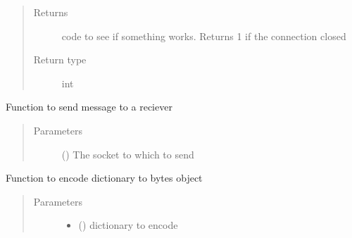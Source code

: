 \documentclass[letterpaper,10pt,english]{sphinxmanual}
\begin{document}
\begin{fulllineitems}
\begin{fulllineitems}
\begin{quote}
\begin{description}
\begin{itemize}
\end{itemize}

\item[{Returns}] \leavevmode
code to see if something works. Returns \sphinxhyphen{}1 if the connection closed

\item[{Return type}] \leavevmode
int

\end{description}\end{quote}

\end{fulllineitems}


\begin{fulllineitems}
\label{\detokenize{Message:Message.Message._send_msg_to_reciever}}
Function to send message to a reciever
\begin{quote}\begin{description}
\item[{Parameters}] \leavevmode
{} () \textendash{} The socket to which to send

\end{description}\end{quote}

\end{fulllineitems}


\begin{fulllineitems}
\label{\detokenize{Message:Message.Message._json_encode}}
Function to encode dictionary to bytes object
\begin{quote}\begin{description}
\item[{Parameters}] \leavevmode\begin{itemize}
\item {} 
 () \textendash{} dictionary to encode


\end{itemize}
\end{description}
\end{quote}
\end{fulllineitems}
\end{fulllineitems}
\end{document}

